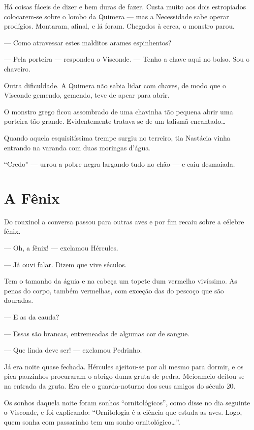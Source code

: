Há coisas fáceis de dizer e bem duras de fazer. Custa muito aos dois
estropiados colocarem-se sobre o lombo da Quimera --- mas a Necessidade
sabe operar prodígios. Montaram, afinal, e lá foram. Chegados à cerca, o
monstro parou.

--- Como atravessar estes malditos arames espinhentos?

--- Pela porteira --- respondeu o Visconde. --- Tenho a chave aqui no
bolso. Sou o chaveiro.

Outra dificuldade. A Quimera não sabia lidar com chaves, de modo que o
Visconde gemendo, gemendo, teve de apear para abrir.

O monstro grego ficou assombrado de uma chavinha tão pequena abrir uma
porteira tão grande. Evidentemente tratava se de um talismã
encantado\ldots{}

Quando aquela esquisitíssima trempe surgiu no terreiro, tia Nastácia
vinha entrando na varanda com duas moringas d'água.

``Credo'' --- urrou a pobre negra largando tudo no chão --- e caiu
desmaiada.


\chapter{A Fênix}

Do rouxinol a conversa passou para outras aves e por fim recaiu sobre a
célebre fênix.

--- Oh, a fênix! --- exclamou Hércules.

--- Já ouvi falar. Dizem que vive séculos.

Tem o tamanho da águia e na cabeça um topete dum vermelho vivíssimo. As
penas do corpo, também vermelhas, com exceção das do pescoço que são
douradas.

--- E as da cauda?

--- Essas são brancas, entremeadas de algumas cor de sangue.

--- Que linda deve ser! --- exclamou Pedrinho.

Já era noite quase fechada. Hércules ajeitou-se por ali mesmo para
dormir, e os pica-pauzinhos procuraram o abrigo duma gruta de pedra.
Meioameio deitou-se na entrada da gruta. Era ele o guarda-noturno dos
seus amigos do século 20.

Os sonhos daquela noite foram sonhos ``ornitológicos'', como disse no dia
seguinte o Visconde, e foi explicando: ``Ornitologia é a ciência que
estuda as aves. Logo, quem sonha com passarinho tem um sonho
ornitológico\ldots{}''.

